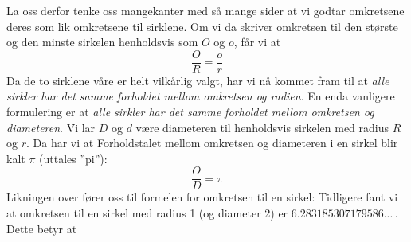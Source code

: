 {La oss derfor tenke oss mangekanter med så mange sider at vi godtar omkretsene deres som lik omkretsene til sirklene. Om vi da skriver omkretsen til den største og den minste sirkelen henholdsvis som $ O $ og $ o $, får vi at 
\[ \frac{O}{R}=\frac{o}{r} \]
Da de to sirklene våre er helt vilkårlig valgt, har vi nå kommet fram til at \textit{alle sirkler har det samme forholdet mellom omkretsen og radien}. En enda vanligere formulering er at \textit{alle sirkler har det samme forholdet mellom omkretsen og diameteren}. Vi lar $ D $ og $ d $ være diameteren til henholdsvis sirkelen med radius $ R $ og $ r $. Da har vi at
Forholdstalet mellom omkretsen og diameteren i en sirkel blir kalt $ \pi $ \index{$ \pi $}(uttales ''pi''):
\[ \frac{O}{D}=\pi \]
Likningen over fører oss til formelen for omkretsen til en sirkel:
Tidligere fant vi at omkretsen til en sirkel med radius 1 (og diameter 2) er $ 6.283185307179586... $\,. Dette betyr at
}

\newpage
{}

